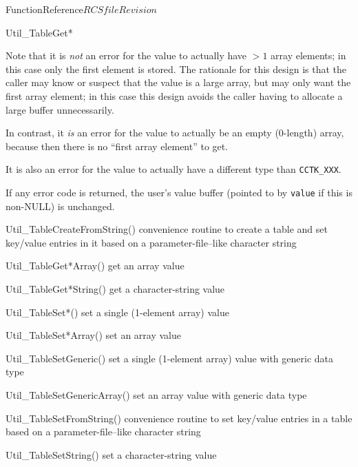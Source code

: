 \begin{cactuspart}{FunctionReference}{$RCSfile$}{$Revision$}
\begin{FunctionDescription}{Util\_TableGet*}
\begin{Discussion}
Note that it is {\em not\/} an error for the value to actually have
$> 1$ array elements; in this case only the first element is stored.
The rationale for this design is that the caller may know or suspect
that the value is a large array, but may only want the first array
element; in this case this design avoids the caller having to allocate
a large buffer unnecessarily.

In contrast, it {\em is\/} an error for the value to actually be an
empty (0-length) array, because then there is no ``first array element''
to get.

It is also an error for the value to actually have a different type
than \verb|CCTK_XXX|.

If any error code is returned, the user's value buffer
(pointed to by \verb|value| if this is non-NULL) is unchanged.
\end{Discussion}

\begin{SeeAlsoSection}
\begin{SeeAlso}{Util\_TableCreateFromString()}
convenience routine to create a table and set key/value entries
in it based on a parameter-file--like character string
\end{SeeAlso}
\begin{SeeAlso}{Util\_TableGet*Array()}
get an array value
\end{SeeAlso}
\begin{SeeAlso}{Util\_TableGet*String()}
get a character-string value
\end{SeeAlso}
\begin{SeeAlso}{Util\_TableSet*()}
set a single (1-element array) value
\end{SeeAlso}
\begin{SeeAlso}{Util\_TableSet*Array()}
set an array value
\end{SeeAlso}
\begin{SeeAlso}{Util\_TableSetGeneric()}
set a single (1-element array) value with generic data type
\end{SeeAlso}
\begin{SeeAlso}{Util\_TableSetGenericArray()}
set an array value with generic data type
\end{SeeAlso}
\begin{SeeAlso}{Util\_TableSetFromString()}
convenience routine to set key/value entries in a table based on a
parameter-file--like character string
\end{SeeAlso}
\begin{SeeAlso}{Util\_TableSetString()}
set a character-string value
\end{SeeAlso}
\end{SeeAlsoSection}


\end{FunctionDescription}
\end{cactuspart}
